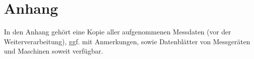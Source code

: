 \section{Anhang}
In den Anhang gehört eine Kopie aller aufgenommenen Messdaten (vor der Weiterverarbeitung), ggf. mit Anmerkungen, sowie Datenblätter von Messgeräten und Maschinen soweit verfügbar.